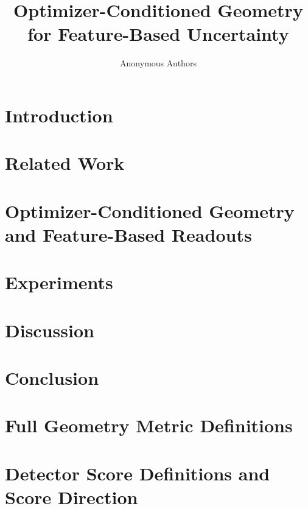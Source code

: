 \documentclass{article} %
\title{Optimizer-Conditioned Geometry for Feature-Based Uncertainty}
\author{Anonymous Authors}
\begin{document}
\maketitle

\begin{abstract}

\end{abstract}

\section{Introduction}
\label{sec:introduction}


\section{Related Work}
\label{sec:related-work}


\section{Optimizer-Conditioned Geometry and Feature-Based Readouts}
\label{sec:method}


\section{Experiments}
\label{sec:experiments}


\section{Discussion}
\label{sec:discussion}


\section{Conclusion}
\label{sec:conclusion}





\appendix
\section{Full Geometry Metric Definitions}
\label{app:geometry-metrics}


\section{Detector Score Definitions and Score Direction}
\label{app:detector-scores}

\end{document}
